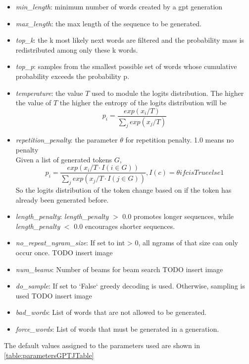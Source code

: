 \documentclass{article}
\begin{document}
\begin{itemize}
    \item \textit{min\_length}: minimum number of words created by a gpt generation
    \item \textit{max\_length}: the max length of the sequence to be generated.  
    \item \textit{top\_k}: the k most likely next words are filtered and the probability mass is redistributed among only these k words.
    
    \item \textit{top\_p}: samples from the smallest possible set of words whose cumulative probability exceeds the probability p.
    \item \textit{temperature}: the value $T$ used to module the logits distribution. The higher the value of $T$ the higher the entropy of the logits distribution will be
    \begin{equation}
        p_i = \frac{exp(x_i/T)}{\sum_j exp(x_j/T)}   
    \end{equation}
    \item \textit{repetition\_penalty}: the parameter $\theta$ for repetition penalty. 1.0 means no penalty \\
    Given a list of generated tokens $G$, 
     \begin{equation}
        p_i = \frac{exp(x_i/T \cdot I(i \in G))}{\sum_j exp(x_j/T \cdot I(j \in G))}, I(c) = \theta if c is True else 1
    \end{equation}
    So the logits distribution of the token change based on if the token has already been generated before.

    \item \textit{length\_penalty}: \textit{length\_penalty} $>$ 0.0 promotes longer sequences, while \textit{length\_penalty} $<$ 0.0 encourages shorter sequences.
    \item \textit{no\_repeat\_ngram\_size}: If set to int > 0, all ngrams of that size can only occur once.
     TODO insert image
    \item \textit{num\_beams}: Number of beams for beam search
     TODO insert image
    \item \textit{do\_sample}: If set to `False` greedy decoding is used. Otherwise, sampling is used
     TODO insert image
    \item \textit{bad\_words}: List of words that are not allowed to be generated.
    \item \textit{force\_words}: List of words that must be generated in a generation.
    
\end{itemize}
The default values assigned to the parameters used are shown in \autoref{table:parametersGPTJTable}
\end{document}
